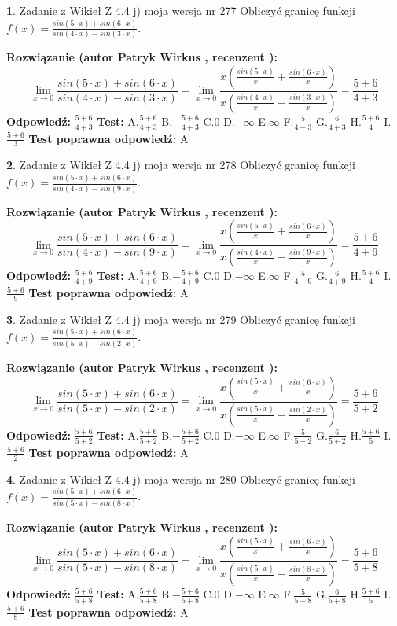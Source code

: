 \documentclass[12pt, a4paper]{article}
\theoremstyle{definition} %
\newtheorem{zad}{}
\newcommand{\zadStart}[1]{\begin{zad}#1\newline}
\newcommand{\zadStop}{\end{zad}}
\newcommand{\rozwStart}[2]{\noindent \textbf{Rozwiązanie (autor #1 , recenzent #2): }\newline}
\newcommand{\rozwStop}{\newline}
\newcommand{\odpStart}{\noindent \textbf{Odpowiedź:}\newline}
\newcommand{\odpStop}{\newline}
\newcommand{\testStart}{\noindent \textbf{Test:}\newline}
\newcommand{\testStop}{\newline}
\newcommand{\kluczStart}{\noindent \textbf{Test poprawna odpowiedź:}\newline}
\newcommand{\kluczStop}{\newline}
\begin{document}
\zadStart{Zadanie z Wikieł Z 4.4 j) moja wersja nr 277}
Obliczyć granicę funkcji $f(x)=\frac{sin(5\cdot x) +sin(6\cdot x)}{sin(4\cdot x) -sin(3\cdot x)}$.
\zadStop
\rozwStart{Patryk Wirkus}{}
$$\lim\limits_{x\to 0}\frac{sin(5\cdot x) +sin(6\cdot x)}{sin(4\cdot x) -sin(3\cdot x)}=\lim\limits_{x\to 0}\frac{x(\frac{sin(5\cdot x)}{x}+\frac{sin(6\cdot x)}{x})}{x(\frac{sin(4\cdot x)}{x}-\frac{sin(3\cdot x)}{x})}=\frac{5+6}{4+3}$$
\rozwStop
\odpStart
$\frac{5+6}{4+3}$
\odpStop
\testStart
A.$\frac{5+6}{4+3}$
B.$-\frac{5+6}{4+3}$
C.$0$
D.$-\infty$
E.$\infty$
F.$\frac{5}{4+3}$
G.$\frac{6}{4+3}$
H.$\frac{5+6}{4}$
I.$\frac{5+6}{3}$
\testStop
\kluczStart
A
\kluczStop



\zadStart{Zadanie z Wikieł Z 4.4 j) moja wersja nr 278}
Obliczyć granicę funkcji $f(x)=\frac{sin(5\cdot x) +sin(6\cdot x)}{sin(4\cdot x) -sin(9\cdot x)}$.
\zadStop
\rozwStart{Patryk Wirkus}{}
$$\lim\limits_{x\to 0}\frac{sin(5\cdot x) +sin(6\cdot x)}{sin(4\cdot x) -sin(9\cdot x)}=\lim\limits_{x\to 0}\frac{x(\frac{sin(5\cdot x)}{x}+\frac{sin(6\cdot x)}{x})}{x(\frac{sin(4\cdot x)}{x}-\frac{sin(9\cdot x)}{x})}=\frac{5+6}{4+9}$$
\rozwStop
\odpStart
$\frac{5+6}{4+9}$
\odpStop
\testStart
A.$\frac{5+6}{4+9}$
B.$-\frac{5+6}{4+9}$
C.$0$
D.$-\infty$
E.$\infty$
F.$\frac{5}{4+9}$
G.$\frac{6}{4+9}$
H.$\frac{5+6}{4}$
I.$\frac{5+6}{9}$
\testStop
\kluczStart
A
\kluczStop



\zadStart{Zadanie z Wikieł Z 4.4 j) moja wersja nr 279}
Obliczyć granicę funkcji $f(x)=\frac{sin(5\cdot x) +sin(6\cdot x)}{sin(5\cdot x) -sin(2\cdot x)}$.
\zadStop
\rozwStart{Patryk Wirkus}{}
$$\lim\limits_{x\to 0}\frac{sin(5\cdot x) +sin(6\cdot x)}{sin(5\cdot x) -sin(2\cdot x)}=\lim\limits_{x\to 0}\frac{x(\frac{sin(5\cdot x)}{x}+\frac{sin(6\cdot x)}{x})}{x(\frac{sin(5\cdot x)}{x}-\frac{sin(2\cdot x)}{x})}=\frac{5+6}{5+2}$$
\rozwStop
\odpStart
$\frac{5+6}{5+2}$
\odpStop
\testStart
A.$\frac{5+6}{5+2}$
B.$-\frac{5+6}{5+2}$
C.$0$
D.$-\infty$
E.$\infty$
F.$\frac{5}{5+2}$
G.$\frac{6}{5+2}$
H.$\frac{5+6}{5}$
I.$\frac{5+6}{2}$
\testStop
\kluczStart
A
\kluczStop



\zadStart{Zadanie z Wikieł Z 4.4 j) moja wersja nr 280}
Obliczyć granicę funkcji $f(x)=\frac{sin(5\cdot x) +sin(6\cdot x)}{sin(5\cdot x) -sin(8\cdot x)}$.
\zadStop
\rozwStart{Patryk Wirkus}{}
$$\lim\limits_{x\to 0}\frac{sin(5\cdot x) +sin(6\cdot x)}{sin(5\cdot x) -sin(8\cdot x)}=\lim\limits_{x\to 0}\frac{x(\frac{sin(5\cdot x)}{x}+\frac{sin(6\cdot x)}{x})}{x(\frac{sin(5\cdot x)}{x}-\frac{sin(8\cdot x)}{x})}=\frac{5+6}{5+8}$$
\rozwStop
\odpStart
$\frac{5+6}{5+8}$
\odpStop
\testStart
A.$\frac{5+6}{5+8}$
B.$-\frac{5+6}{5+8}$
C.$0$
D.$-\infty$
E.$\infty$
F.$\frac{5}{5+8}$
G.$\frac{6}{5+8}$
H.$\frac{5+6}{5}$
I.$\frac{5+6}{8}$
\testStop
\kluczStart
A
\kluczStop
\end{document}
